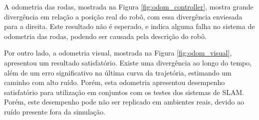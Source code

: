 \documentclass[repeatfields,xlists,xpacks,oneside,yearsonly]{ufrgscca}
\begin{document}
A odometria das rodas, mostrada na Figura \ref{fig:odom_controller},
mostra grande divergência em relação a posição real do robô, com essa
divergência enviesada para a direita. 
Este resultado não é esperado, e indica alguma falha no sistema de odometria
das rodas, podendo ser causada pela descrição do robô.

Por outro lado, a odometria visual, mostrada na Figura \ref{fig:odom_visual},
apresentou um resultado satisfatório. Existe uma divergência ao longo do tempo, 
além de um erro significativo na última curva da trajetória, estimando um caminho
com alto ruído.
Porém, esta odometria apresentou desempenho satisfatório para utilização 
em conjuntos com os testes dos sistemas de SLAM.
Porém, este desempenho pode não ser replicado em ambientes reais, devido
ao ruído presente fora da simulação.
\end{document}
